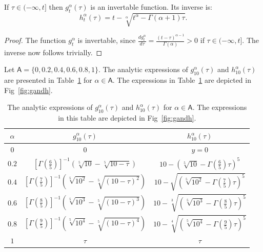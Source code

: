\documentclass[twoside,reqno,11pt]{fcaa-var} %
\begin{document}
\begin{theorem}
If $\tau\in(-\infty,t]$ then $g_t^{\alpha}(\tau)$ is an invertable function. Its inverse is:
\begin{equation}
h_t^{\alpha}(\tau) = t - \sqrt[\alpha]{t^{\alpha} - \Gamma(\alpha+1)\tau}.
\end{equation}
\end{theorem}
\begin{proof}
The function $g_t^{\alpha}$ is invertable, since $\frac{d g_t^{\alpha}}{d\tau}=\frac{(t-\tau)^{\alpha-1}}{\Gamma(\alpha)} > 0$ if $\tau\in(-\infty,t]$. The inverse now follows trivially.  
\end{proof}

\noindent
Let $\mathsf{A} = \{0,0.2,0.4,0.6,0.8,1\}$. The analytic expressions of $g_{10}^{\alpha}(\tau)$ and $h_{10}^{\alpha}(\tau)$ are presented in Table~\ref{tab:gandh} for $\alpha\in\mathsf{A}$. 
The expressions in Table~\ref{tab:gandh} are depicted in Fig~\ref{fig:gandh}.

\begin{table}[h!]
 \centering
 \caption{The analytic expressions of $g_{10}^{\alpha}(\tau)$ and $h_{10}^{\alpha}(\tau)$ for $\alpha\in\mathsf{A}$. The expressions in this table are depicted in Fig~\ref{fig:gandh}.}
 \label{tab:gandh}
 \begin{tabular}{|c || c | c|} 
 \hline
 $\alpha$ & $g_{10}^{\alpha}(\tau)$ & $h_{10}^{\alpha}(\tau)$ \\ [0.5ex] 
 \hline\hline
 $0$ & 0 & $y=0$ \\ 
 $0.2$ & $[\Gamma\left (\frac{6}{5} \right )]^{-1}\left(\sqrt[5]{10}-\sqrt[5]{10-\tau}\right)$ & $10 - \left ( \sqrt[5]{10} -  \Gamma\left (\frac{6}{5} \right ) \tau \right )^5$  \\
 $0.4$ & $[\Gamma\left (\frac{7}{5} \right )]^{-1}\left(\sqrt[5]{10^2}-\sqrt[5]{(10-\tau)^2}\right)$ & $10 - \sqrt{\left ( \sqrt[5]{10^2} -  \Gamma\left (\frac{7}{5} \right ) \tau \right )^5}$ \\
 $0.6$ & $[\Gamma\left (\frac{8}{5} \right )]^{-1}\left(\sqrt[5]{10^3}-\sqrt[5]{(10-\tau)^3}\right)$ & $10 - \sqrt[3]{\left ( \sqrt[5]{10^3} -  \Gamma\left (\frac{8}{5} \right ) \tau \right )^5}$ \\
 $0.8$ & $[\Gamma\left (\frac{9}{5} \right )]^{-1}\left(\sqrt[5]{10^4}-\sqrt[5]{(10-\tau)^4}\right)$ & $10 - \sqrt[4]{\left ( \sqrt[5]{10^4} -  \Gamma\left (\frac{9}{5} \right ) \tau \right )^5}$ \\ [1ex] 
 $1$ & $\tau$ & $\tau$ \\ [1ex] 
 \hline
 \end{tabular}
 \end{table}
\end{document}
